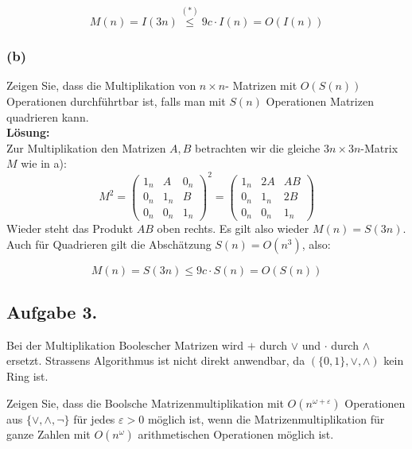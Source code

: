 \documentclass[11pt,a4paper,ngerman]{article}
\begin{document}
\begin{equation}
  M(n) = I(3n) \stackrel{(*)}{\leq} 9c\cdot I(n) = O(I(n))
\end{equation}
\subsubsection*{(b)}

Zeigen Sie, dass die Multiplikation von $n \times n$- Matrizen mit $O(S(n))$ Operationen durchführtbar ist, falls man mit $S(n)$ Operationen Matrizen quadrieren kann.\\

\textbf{Lösung:}\\
Zur Multiplikation den Matrizen $A,B$ betrachten wir die gleiche $3n \times 3n$-Matrix $M$ wie in a):
\begin{equation}\label{eq:square}
  M^{2} = \left(\begin{array}{ccc}
              1_n & A   & 0_n \\
              0_n & 1_n & B \\
              0_n & 0_n & 1_n
           \end{array}\right)^{2}
         = \left(\begin{array}{ccc}
              1_n & 2A   & AB \\
              0_n & 1_n & 2B \\
              0_n & 0_n & 1_n
           \end{array}\right)
\end{equation}
Wieder steht das Produkt $AB$ oben rechts. Es gilt also wieder $M(n) = S(3n)$. Auch für Quadrieren gilt
die Abschätzung $S(n) = O(n^3)$, also:

\begin{equation}
  M(n) = S(3n) {\leq} 9c\cdot S(n) = O(S(n))
\end{equation}


\subsection*{Aufgabe 3.}

Bei der Multiplikation Boolescher Matrizen wird $+$ durch $\lor$ und $\cdot$ durch $\land$ ersetzt. Strassens Algorithmus ist nicht direkt anwendbar, da $(\{0,1\}, \lor, \land)$ kein Ring ist.

Zeigen Sie, dass die Boolsche Matrizenmultiplikation mit $O( n^{\omega + \varepsilon} )$ Operationen aus $\{ \lor, \land, \neg \}$ für jedes $\varepsilon > 0$ möglich ist, wenn die Matrizenmultiplikation für ganze Zahlen mit $O(n^\omega )$ arithmetischen Operationen möglich ist.\\
\end{document}
